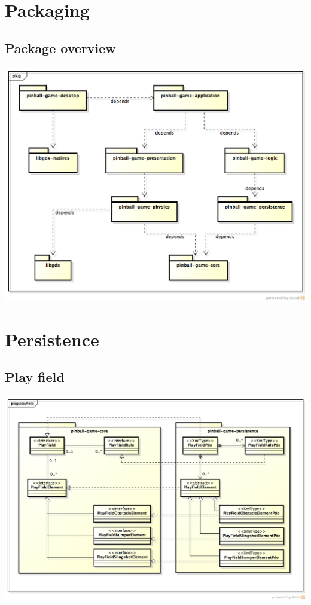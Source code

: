 \documentclass[fontsize=12pt,
               paper=a4,
               twoside=false,
               parskip=half,
               ]{scrartcl}
\begin{document}
\newcommand{\doctitle}{Design Model}
	

\tableofcontents

\section{Packaging}
\subsection{Package overview}
\includegraphics[width=15.5cm]{./img/package-overview.png}

\section{Persistence}

\subsection{Play field}
\includegraphics[width=15.5cm]{./img/persistence-playfield.png}
\end{document}
